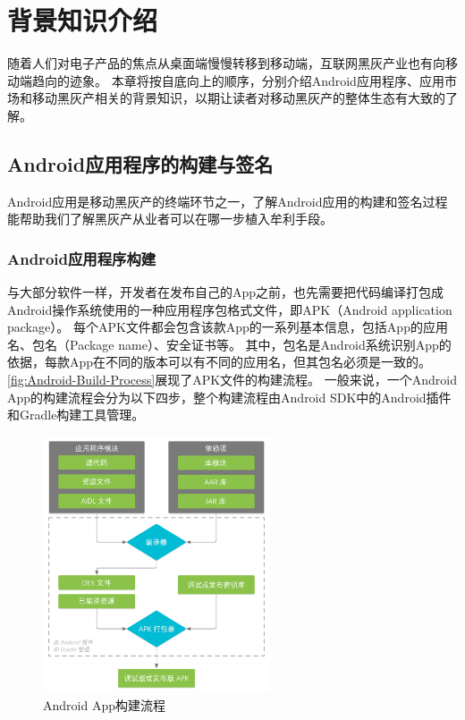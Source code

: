 \chapter{背景知识介绍}
\label{chp:background}

随着人们对电子产品的焦点从桌面端慢慢转移到移动端，互联网黑灰产业也有向移动端趋向的迹象。
本章将按自底向上的顺序，分别介绍Android应用程序、应用市场和移动黑灰产相关的背景知识，以期让读者对移动黑灰产的整体生态有大致的了解。

\section{Android应用程序的构建与签名}

Android应用是移动黑灰产的终端环节之一，了解Android应用的构建和签名过程能帮助我们了解黑灰产从业者可以在哪一步植入牟利手段。

\subsection{Android应用程序构建}

与大部分软件一样，开发者在发布自己的App之前，也先需要把代码编译打包成Android操作系统使用的一种应用程序包格式文件，即APK（Android application package）。
每个APK文件都会包含该款App的一系列基本信息，包括App的应用名、包名（Package name）、安全证书等。
其中，包名是Android系统识别App的依据，每款App在不同的版本可以有不同的应用名，但其包名必须是一致的。
\autoref{fig:Android-Build-Process}展现了APK文件的构建流程。
一般来说，一个Android App的构建流程会分为以下四步，整个构建流程由Android SDK中的Android插件和Gradle构建工具管理。

\begin{figure}[htbp]
	\centering
	\includegraphics[width=0.6\textwidth]{./Figures/edwin-build-process-CHN.png}
	\caption{Android App构建流程}
	\label{fig:Android-Build-Process}
\end{figure}

